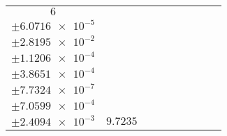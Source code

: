 \documentclass[8pt]{article}
\begin{document}
\begin{longtable}[l]{c c c c c c c c c}
$\num{6}$ & \begin{tabular}[c]{@{}c@{}}$\num{0.12366}$ \\ $\pm\num{6.0716e-5}$\end{tabular} & \begin{tabular}[c]{@{}c@{}}$\num{0.31832}$ \\ $\pm\num{2.8195e-2}$\end{tabular} & \begin{tabular}[c]{@{}c@{}}$\num{6.649}$ \\ $\pm\num{1.1206e-4}$\end{tabular} & \begin{tabular}[c]{@{}c@{}}$\num{951.24}$ \\ $\pm\num{3.8651e-4}$\end{tabular} & \begin{tabular}[c]{@{}c@{}}$\num{1.903}$ \\ $\pm\num{7.7324e-7}$\end{tabular} & \begin{tabular}[c]{@{}c@{}}$\num{1.1863}$ \\ $\pm\num{7.0599e-4}$\end{tabular} & \begin{tabular}[c]{@{}c@{}}$\num{4.2577}$ \\ $\pm\num{2.4094e-3}$\end{tabular} & $\num{9.7235}$\\
\bottomrule
\end{longtable}
\end{document}
